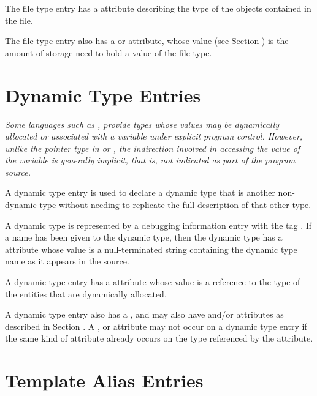 The file type entry has 
a \DWATtype{} attribute describing
the type of the objects contained in the file.

The file type entry also has a 
\DWATbytesize{} or
\DWATbitsize{} attribute, whose value 
(see Section )
is the amount of storage need to hold a value of the file type.

\section{Dynamic Type Entries}
\label{chap:dynamictypeentries}
\textit{Some languages such as 
, provide types whose values
may be dynamically allocated or associated with a variable
under explicit program control. However, unlike the
pointer type in  or 
, the indirection involved in accessing
the value of the variable is generally implicit, that is, not
indicated as part of the program source.}

A dynamic type entry is used to declare a dynamic type that is 
 another non-dynamic type without needing to
replicate the full description of that other type.

A dynamic type is represented by a debugging information entry
with the tag \DWTAGdynamictypeTARG. If a name has been given to the
dynamic type, then the dynamic type has a \DWATname{} attribute 
whose value is a null-terminated string containing the dynamic
type name as it appears in the source.
	
A dynamic type entry has a \DWATtype{} attribute whose value is a
reference to the type of the entities that are dynamically allocated.
	
A dynamic type entry also has a \DWATdatalocation, and may also
have \DWATallocated{} and/or \DWATassociated{} attributes as 
described in Section . 
A \DWATdatalocation, \DWATallocated{} or \DWATassociated{} attribute 
may not occur on a dynamic type entry if the same kind of attribute 
already occurs on the type referenced by the \DWATtype{} attribute.


\section{Template Alias Entries}
\label{chap:templatealiasentries}

